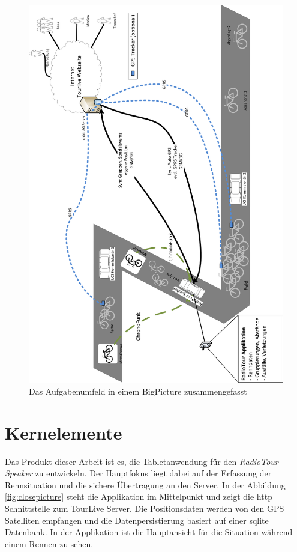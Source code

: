 \begin{figure}[h!]
\caption{Das Aufgabenumfeld in einem BigPicture zusammengefasst}
\centering
\includegraphics[scale=0.7]{05bericht/images/bigpicture.png}
\end{figure}

\newpage

\section{Kernelemente}
Das Produkt dieser Arbeit ist es, die Tabletanwendung für den \textit{RadioTour Speaker} zu entwickeln. Der Hauptfokus liegt dabei auf der Erfassung der Rennsituation und die sichere Übertragung an den Server. In der Abbildung \ref{fig:closepicture} steht die Applikation im Mittelpunkt und zeigt die \gls{http} Schnittstelle zum TourLive Server. Die Positionsdaten werden von den GPS Satelliten empfangen und die Datenpersistierung basiert auf einer \gls{sqlite} Datenbank. In der Applikation ist die Hauptansicht für die Situation während einem Rennen zu sehen.
\\

